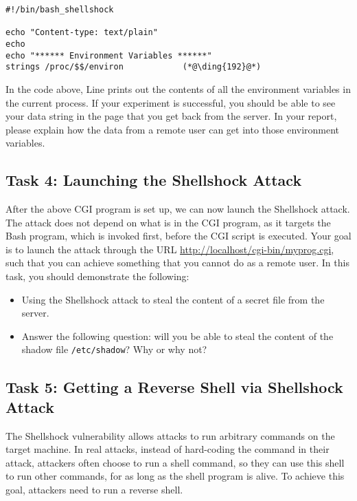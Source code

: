 \begin{lstlisting}
#!/bin/bash_shellshock             

echo "Content-type: text/plain"
echo
echo "****** Environment Variables ******"
strings /proc/$$/environ            (*@\ding{192}@*)
\end{lstlisting}


In the code above, Line  prints out the contents of all the
environment variables in the current process. If your experiment is
successful, you should be able to see your data string in the page that you get 
back from the server. In your report, please explain how the data from a remote user can get into
those environment variables. 


\subsection{Task 4: Launching the Shellshock Attack}

After the above CGI program is set up, we can now launch the Shellshock attack. 
The attack does not depend on what is in the CGI program, as it targets
the Bash program, which is invoked first, before the CGI script is
executed. Your goal is to launch the attack through the URL
\url{http://localhost/cgi-bin/myprog.cgi}, such that you can achieve
something that you cannot do as a remote user. In this task, you should
demonstrate the following:


\begin{itemize} 
\item Using the Shellshock attack to steal the content of a secret file
from the server.  

\item Answer the following question:  will you be able to steal the content of 
the shadow file \texttt{/etc/shadow}? Why or why not?  
\end{itemize} 
  




\subsection{Task 5: Getting a Reverse Shell via Shellshock Attack}

The Shellshock vulnerability allows attacks to run arbitrary commands on
the target machine. In real attacks, instead of hard-coding the command 
in their attack, attackers often choose to run a shell
command, so they can use this shell to run other commands,
for as long as the shell program is alive. 
To achieve this goal, attackers need to run a reverse shell.

